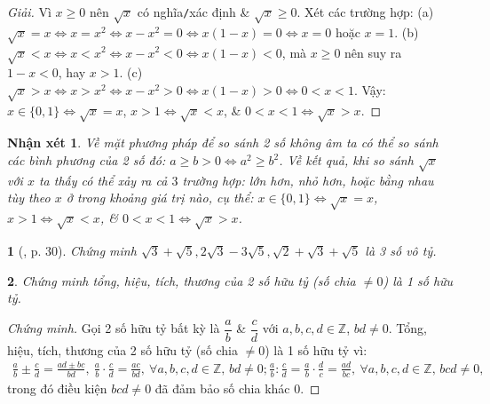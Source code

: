 \documentclass{article}
\newtheorem{baitoan}{}
\newtheorem{nhanxet}{Nhận xét}
\begin{document}
\begin{proof}[Giải]
	Vì $x\ge0$ nên $\sqrt{x}$ có nghĩa\texttt{/}xác định \& $\sqrt{x}\ge0$. Xét các trường hợp: (a) $\sqrt{x} = x\Leftrightarrow x = x^2\Leftrightarrow x - x^2 = 0\Leftrightarrow x(1 - x) = 0\Leftrightarrow x = 0$ hoặc $x = 1$. (b) $\sqrt{x} < x\Leftrightarrow x < x^2\Leftrightarrow x - x^2 < 0\Leftrightarrow x(1 - x) < 0$, mà $x\ge0$ nên suy ra $1 - x < 0$, hay $x > 1$. (c) $\sqrt{x} > x\Leftrightarrow x > x^2\Leftrightarrow x - x^2 > 0\Leftrightarrow x(1 - x) > 0\Leftrightarrow 0 < x < 1$. Vậy: $x\in\{0,1\}\Leftrightarrow\sqrt{x} = x$, $x > 1\Leftrightarrow\sqrt{x} < x$, \& $0 < x < 1\Leftrightarrow\sqrt{x} > x$.
\end{proof}

\begin{nhanxet}
	Về mặt phương pháp để so sánh 2 số không âm ta có thể so sánh các bình phương của 2 số đó: $a\ge b > 0\Leftrightarrow a^2\ge b^2$. Về kết quả, khi so sánh $\sqrt{x}$ với $x$ ta thấy có thể xảy ra cả $3$ trường hợp: lớn hơn, nhỏ hơn, hoặc bằng nhau tùy theo $x$ ở trong khoảng giá trị nào, cụ thể: $x\in\{0,1\}\Leftrightarrow\sqrt{x} = x$, $x > 1\Leftrightarrow\sqrt{x} < x$, \& $0 < x < 1\Leftrightarrow\sqrt{x} > x$.
\end{nhanxet}

\begin{baitoan}[\cite{Binh_boi_duong_Toan_9_tap_1}, p. 30]
	Chứng minh $\sqrt{3} + \sqrt{5},2\sqrt{3} - 3\sqrt{5},\sqrt{2} + \sqrt{3} + \sqrt{5}$ là 3 số vô tỷ.
\end{baitoan}

\begin{baitoan}
	Chứng minh tổng, hiệu, tích, thương của 2 số hữu tỷ (số chia $\ne0$) là 1 số hữu tỷ.
\end{baitoan}

\begin{proof}[Chứng minh]
	Gọi 2 số hữu tỷ bất kỳ là $\dfrac{a}{b}$ \& $\dfrac{c}{d}$ với $a,b,c,d\in\mathbb{Z}$, $bd\ne0$. Tổng, hiệu, tích, thương của 2 số hữu tỷ (số chia $\ne0$) là 1 số hữu tỷ vì:
	\begin{align*}
		\frac{a}{b}\pm\frac{c}{d} = \frac{ad\pm bc}{bd},\ \frac{a}{b}\cdot\frac{c}{d} = \frac{ac}{bd},\ \forall a,b,c,d\in\mathbb{Z},\,bd\ne0; \frac{a}{b}:\frac{c}{d} = \frac{a}{b}\cdot\frac{d}{c} = \frac{ad}{bc},\ \forall a,b,c,d\in\mathbb{Z},\,bcd\ne0,
	\end{align*}
	trong đó điều kiện $bcd\ne0$ đã đảm bảo số chia khác 0.
\end{proof}
\end{document}
